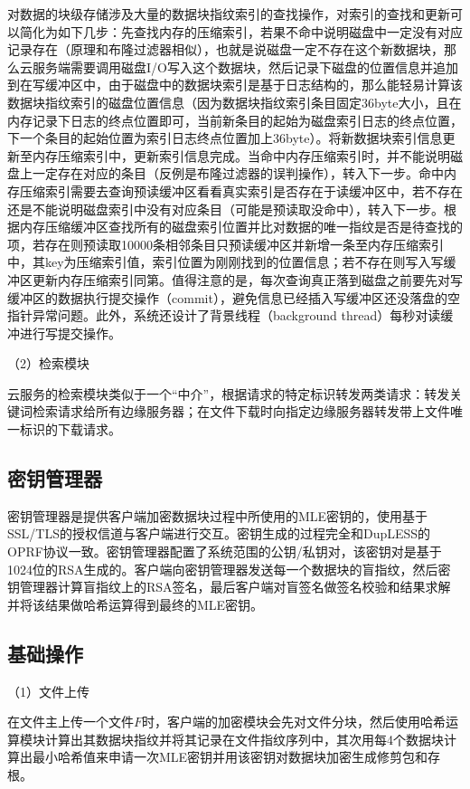 \documentclass[promaster]{thesis-uestc}
\begin{document}
对数据的块级存储涉及大量的数据块指纹索引的查找操作，对索引的查找和更新可以简化为如下几步：先查找内存的压缩索引，若果不命中说明磁盘中一定没有对应记录存在（原理和布隆过滤器相似），也就是说磁盘一定不存在这个新数据块，那么云服务端需要调用磁盘I/O写入这个数据块，然后记录下磁盘的位置信息并追加到在写缓冲区中，由于磁盘中的数据块索引是基于日志结构的，那么能轻易计算该数据块指纹索引的磁盘位置信息（因为数据块指纹索引条目固定36byte大小，且在内存记录下日志的终点位置即可，当前新条目的起始为磁盘索引日志的终点位置，下一个条目的起始位置为索引日志终点位置加上36byte）。将新数据块索引信息更新至内存压缩索引中，更新索引信息完成。当命中内存压缩索引时，并不能说明磁盘上一定存在对应的条目（反例是布隆过滤器的误判操作），转入下一步。命中内存压缩索引需要去查询预读缓冲区看看真实索引是否存在于读缓冲区中，若不存在还是不能说明磁盘索引中没有对应条目（可能是预读取没命中），转入下一步。根据内存压缩缓冲区查找所有的磁盘索引位置并比对数据的唯一指纹是否是待查找的项，若存在则预读取10000条相邻条目只预读缓冲区并新增一条至内存压缩索引中，其key为压缩索引值，索引位置为刚刚找到的位置信息；若不存在则写入写缓冲区更新内存压缩索引同第。值得注意的是，每次查询真正落到磁盘之前要先对写缓冲区的数据执行提交操作（commit），避免信息已经插入写缓冲区还没落盘的空指针异常问题。此外，系统还设计了背景线程（background thread）每秒对读缓冲进行写提交操作。

（2）检索模块

云服务的检索模块类似于一个“中介”，根据请求的特定标识转发两类请求：转发关键词检索请求给所有边缘服务器；在文件下载时向指定边缘服务器转发带上文件唯一标识的下载请求。

\subsection{密钥管理器}
密钥管理器是提供客户端加密数据块过程中所使用的MLE密钥的，使用基于SSL/TLS的授权信道与客户端进行交互。密钥生成的过程完全和DupLESS的OPRF协议一致。密钥管理器配置了系统范围的公钥/私钥对，该密钥对是基于1024位的RSA生成的。客户端向密钥管理器发送每一个数据块的盲指纹，然后密钥管理器计算盲指纹上的RSA签名，最后客户端对盲签名做签名校验和结果求解并将该结果做哈希运算得到最终的MLE密钥。
\subsection{基础操作}

（1）文件上传

在文件主上传一个文件$F$时，客户端的加密模块会先对文件分块，然后使用哈希运算模块计算出其数据块指纹并将其记录在文件指纹序列中，其次用每4个数据块计算出最小哈希值来申请一次MLE密钥并用该密钥对数据块加密生成修剪包和存根。
\end{document}
